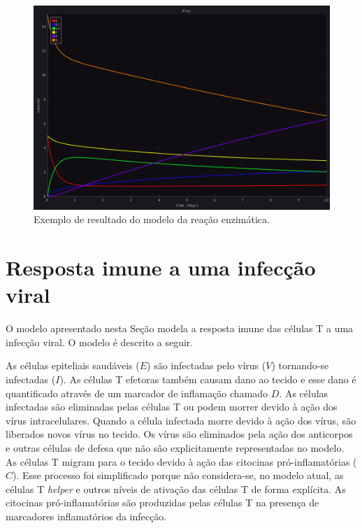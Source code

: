 \documentclass[
	12pt,				%
	openright,			%
	oneside,			%
	a4paper,			%
	main=brazil,
	english,			%
	]{ufsj-abntex2}
\begin{document}
\begin{figure}[h]
    \centering
    \includegraphics[width=\textwidth]{imgs/modelos/resultado-reacaoenzimatica.png} 
    \caption{Exemplo de resultado do modelo da reação enzimática.}
    \label{fig:resultado-reacaoenzimatica}
\end{figure}
    
\section{Resposta imune a uma infecção viral}

O modelo apresentado nesta Seção modela a resposta imune das células T a uma infecção viral. O modelo é descrito a seguir.  

As células epiteliais saudáveis ($E$) são infectadas pelo vírus ($V$) tornando-se infectadas ($I$). As células T efetoras também causam dano ao tecido e esse dano é quantificado através de um marcador de inflamação chamado $D$. As células infectadas são eliminadas pelas células T ou podem morrer devido à ação dos vírus intracelulares. Quando a célula infectada morre devido à ação dos vírus, são liberados novos vírus no tecido. Os vírus são eliminados pela ação dos anticorpos e outras células de defesa que não são explicitamente representadas no modelo. As células T migram para o tecido devido à ação das citocinas pró-inflamatórias ($C$). Esse processo foi simplificado porque não considera-se, no modelo atual, as células T \textit{helper} e outros níveis de ativação das células T de forma explícita. As citocinas pró-inflamatórias são produzidas pelas células T na presença de marcadores inflamatórios da infecção.   
\end{document}
